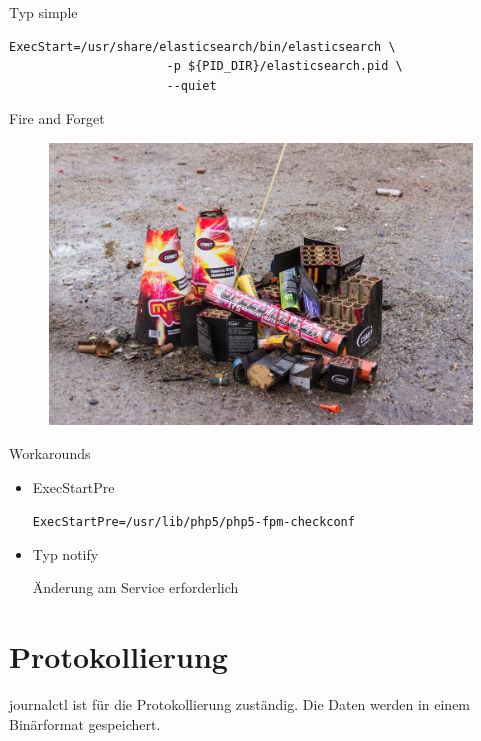 \begin{frame}[fragile]{Typ simple}
\begin{lstlisting}
ExecStart=/usr/share/elasticsearch/bin/elasticsearch \
                      -p ${PID_DIR}/elasticsearch.pid \
                      --quiet
\end{lstlisting}
\end{frame}

\begin{frame}{Fire and Forget}
  \begin{figure}[!ht]
      \centering
      \includegraphics[width=0.9\linewidth]{img/fireworks-1156808_1920.jpg}
   \end{figure}
\end{frame}

\begin{frame}[fragile]{Workarounds}
  \begin{itemize}
     \item ExecStartPre

\verb|ExecStartPre=/usr/lib/php5/php5-fpm-checkconf|

     \item Typ notify

	Änderung am Service erforderlich
  \end{itemize}
\end{frame}

\section{Protokollierung}

journalctl ist für die Protokollierung zuständig. Die Daten werden in einem Binärformat gespeichert.

